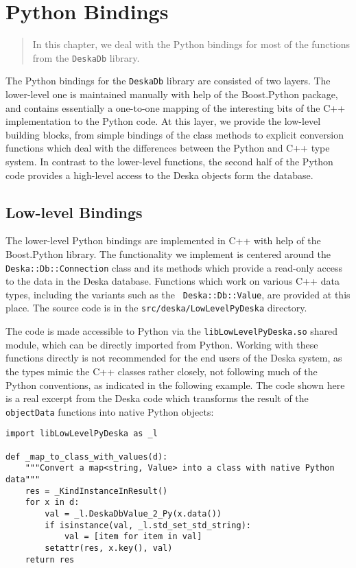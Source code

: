 \documentclass[deska]{subfiles}
\begin{document}
\chapter{Python Bindings}

\begin{abstract}
In this chapter, we deal with the Python bindings for most of the functions from the  {\tt DeskaDb} library.
\end{abstract}

The Python bindings for the {\tt DeskaDb} library are consisted of two layers.  The lower-level one is maintained
manually with help of the Boost.Python package, and contains essentially a one-to-one mapping of the interesting bits of
the C++ implementation to the Python code.  At this layer, we provide the low-level building blocks, from simple
bindings of the class methods to explicit conversion functions which deal with the differences between the Python and
C++ type system.  In contrast to the lower-level functions, the second half of the Python code provides a high-level
access to the Deska objects form the database.

\section{Low-level Bindings}

The lower-level Python bindings are implemented in C++ with help of the Boost.Python library.  The functionality we
implement is centered around the {\tt Deska::Db::Connection} class and its methods which provide a read-only access to
the data in the Deska database.  Functions which work on various C++ data types, including the variants such as the {\tt
Deska::Db::Value}, are provided at this place.  The source code is in the {\tt src/deska/LowLevelPyDeska} directory.

The code is made accessible to Python via the {\tt libLowLevelPyDeska.so} shared module, which can be directly imported
from Python.  Working with these functions directly is not recommended for the end users of the Deska system, as the
types mimic the C++ classes rather closely, not following much of the Python conventions, as indicated in the following
example.  The code shown here is a real excerpt from the Deska code which transforms the result of the {\tt objectData}
functions into native Python objects:

\begin{verbatim}
import libLowLevelPyDeska as _l

def _map_to_class_with_values(d):
    """Convert a map<string, Value> into a class with native Python data"""
    res = _KindInstanceInResult()
    for x in d:
        val = _l.DeskaDbValue_2_Py(x.data())
        if isinstance(val, _l.std_set_std_string):
            val = [item for item in val]
        setattr(res, x.key(), val)
    return res
\end{verbatim}
\end{document}
